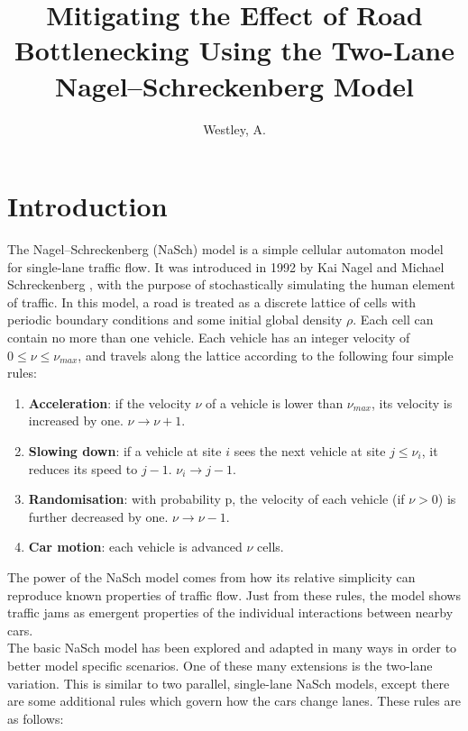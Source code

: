 \documentclass[11pt]{article}
\title{Mitigating the Effect of Road Bottlenecking Using the Two-Lane Nagel--Schreckenberg Model}
\author{Westley, A.}
\begin{document}
	
	\maketitle 
	
	\hfill \break
	
	\section{Introduction} \label{sec:intro}
	
	The Nagel--Schreckenberg (NaSch) model is a simple cellular automaton model for single-lane traffic flow. It was introduced in 1992 by Kai Nagel and Michael Schreckenberg \cite{nagel1992cellular}, with the purpose of stochastically simulating the human element of traffic. In this model, a road is treated as a discrete lattice of cells with periodic boundary conditions and some initial global density $\rho$. Each cell can contain no more than one vehicle. Each vehicle has an integer velocity of $0 \leq \nu \leq \nu_{max}$, and travels along the lattice according to the following four simple rules: 
	
	\begin{enumerate}
		\item \textbf{Acceleration}: if the velocity $\nu$ of a vehicle is lower than $\nu_{max}$, its velocity is increased by one. $\nu \rightarrow \nu + 1$.
		\item \textbf{Slowing down}: if a vehicle at site $i$ sees the next vehicle at site $j \leq \nu_i$, it reduces its speed to $j-1$. $\nu_i \rightarrow j-1$.
		\item \textbf{Randomisation}: with probability p, the velocity of each vehicle (if $\nu > 0$) is further decreased by one. $\nu \rightarrow \nu - 1$.
		\item \textbf{Car motion}: each vehicle is advanced $\nu$ cells.
	\end{enumerate}
	
	The power of the NaSch model comes from how its relative simplicity can reproduce known properties of traffic flow. Just from these rules, the model shows traffic jams as emergent properties of the individual interactions between nearby cars. \\
	
	The basic NaSch model has been explored and adapted in many ways in order to better model specific scenarios. One of these many extensions is the two-lane variation. This is similar to two parallel, single-lane NaSch models, except there are some additional rules which govern how the cars change lanes\cite{wright2013flow}. These rules are as follows:
	
\end{document}

